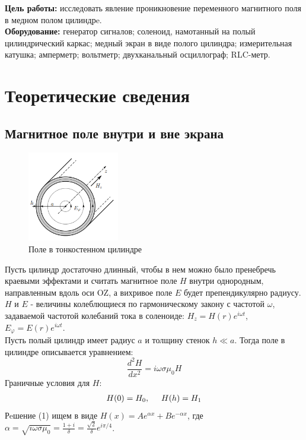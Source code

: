 \textbf{Цель работы:} исследовать явление проникновение переменного магнитного поля в медном полом цилиндрe.\\\indent
\textbf{Оборудование:} генератор сигналов; соленоид, намотанный на полый цилиндрический каркас; медный экран в виде полого цилиндра; измерительная катушка; амперметр; вольтметр; двухканальный осциллограф; RLC-метр.

\section*{Теоретические сведения}
\subsection*{Магнитное поле внутри и вне экрана}
\begin{figure}
    \centering
    \includegraphics[width=4cm]{images/theory.png}
    \caption{Поле в тонкостенном цилиндре}
\end{figure}
\indent Пусть цилиндр достаточно длинный, чтобы в нем можно было пренебречь краевыми эффектами и считать магнитное поле $H$ внутри однородным, направленным вдоль оси OZ, а вихривое поле $E$ будет препендикулярно радиусу. $H$ и $E$ - величины колеблющиеся по гармоническому закону с частотой $\omega$, задаваемой частотой колебаний тока в соленоиде: $H_z = H(r)e^{i\omega t}$, $E_{\varphi} = E(r)e^{i\omega t}$.\\\indent
Пусть полый цилиндр имеет радиус $a$ и толщину стенок $h \ll a$. Тогда поле в цилиндре описывается уравнением:
\begin{equation}
    \frac{d^2 H}{d x^2} = i\omega\sigma\mu_0 H
\end{equation}
Граничные условия для $H$: 
\begin{align}
    H(0) = H_0, \hspace{0.5cm}  H(h) = H_1
\end{align}
Рeшение (1) ищем в виде $H(x) = Ae^{\alpha x} + Be^{-\alpha x}$, где $\alpha = \sqrt{i\omega \sigma \mu_0} = \frac{1 + i}{\delta} = \frac{\sqrt{2}}{\delta}e^{i\pi/4}$.\\
